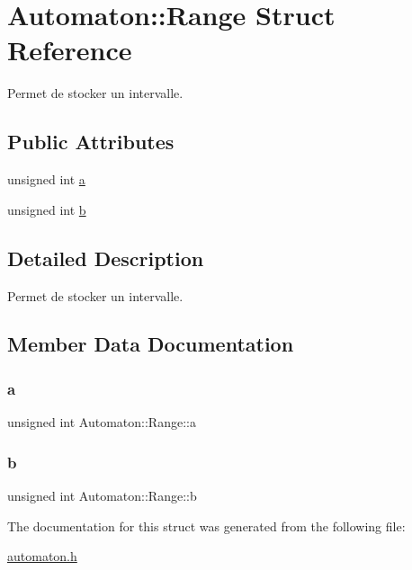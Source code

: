 \hypertarget{struct_automaton_1_1_range}{}\section{Automaton\+:\+:Range Struct Reference}
\label{struct_automaton_1_1_range}


Permet de stocker un intervalle.  


\subsection*{Public Attributes}
\begin{DoxyCompactItemize}
\item 
unsigned int \mbox{\hyperlink{struct_automaton_1_1_range_a95a564b78f9913c5c0bf955a67dd4e5b}{a}}
\item 
unsigned int \mbox{\hyperlink{struct_automaton_1_1_range_a64572f881a1cde5248ff57efdcf073af}{b}}
\end{DoxyCompactItemize}


\subsection{Detailed Description}
Permet de stocker un intervalle. 

\subsection{Member Data Documentation}
\mbox{\label{struct_automaton_1_1_range_a95a564b78f9913c5c0bf955a67dd4e5b}} 
\subsubsection{\texorpdfstring{a}{a}}
{\footnotesize\ttfamily unsigned int Automaton\+::\+Range\+::a}

\mbox{\label{struct_automaton_1_1_range_a64572f881a1cde5248ff57efdcf073af}} 
\subsubsection{\texorpdfstring{b}{b}}
{\footnotesize\ttfamily unsigned int Automaton\+::\+Range\+::b}



The documentation for this struct was generated from the following file\+:\begin{DoxyCompactItemize}
\item 
\mbox{\hyperlink{automaton_8h}{automaton.\+h}}\end{DoxyCompactItemize}
